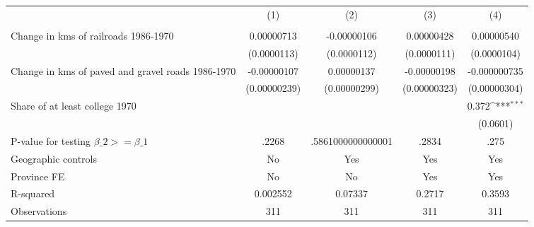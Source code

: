 {
\def\sym#1{\ifmmode^{#1}\else\(^{#1}\)\fi}
\begin{tabular}{l*{4}{c}}
\hline\hline
                &\multicolumn{1}{c}{(1)}&\multicolumn{1}{c}{(2)}&\multicolumn{1}{c}{(3)}&\multicolumn{1}{c}{(4)}\\
                &\multicolumn{1}{c}{}&\multicolumn{1}{c}{}&\multicolumn{1}{c}{}&\multicolumn{1}{c}{}\\
\hline
Change in kms of railroads 1986-1970&0.00000713         &-0.00000106         &0.00000428         &0.00000540         \\
                &(0.0000113)         &(0.0000112)         &(0.0000111)         &(0.0000104)         \\
[1em]
Change in kms of paved and gravel roads 1986-1970&-0.00000107         &0.00000137         &-0.00000198         &-0.000000735         \\
                &(0.00000239)         &(0.00000299)         &(0.00000323)         &(0.00000304)         \\
[1em]
Share of at least college 1970&                  &                  &                  &    0.372\sym{***}\\
                &                  &                  &                  & (0.0601)         \\
\hline
P-value for testing $\beta\_{2} >= \beta\_{1}$&    .2268         &.5861000000000001         &    .2834         &     .275         \\
Geographic controls&       No         &      Yes         &      Yes         &      Yes         \\
Province FE     &       No         &       No         &      Yes         &      Yes         \\
R-squared       & 0.002552         &  0.07337         &   0.2717         &   0.3593         \\
Observations    &      311         &      311         &      311         &      311         \\
\hline\hline
\end{tabular}
}
